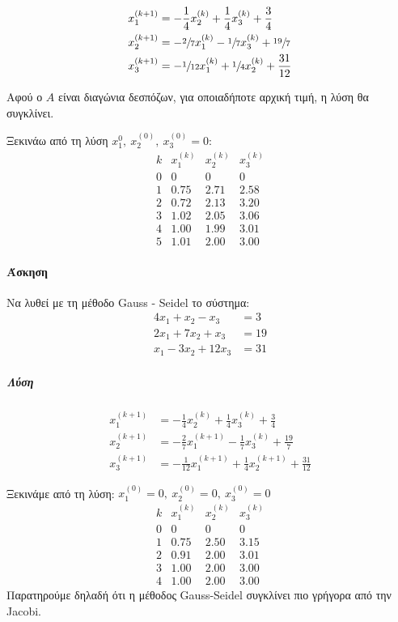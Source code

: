 \documentclass[11pt,a4paper,notitlepage,fleqn]{article}
\begin{document}
\begin{align*}
	x_1^{(k+1)} &= -\frac{1}{4}x_2^{(k)}+\frac{1}{4}x_3^{(k)}+\frac{3}{4}
	\\ x_2^{(k+1)} &= -\sfrac{2}{7} x_1^{(k)}-\sfrac{1}{7} x_3^{(k)}
	+ \sfrac{19}{7} \\
	x_3^{(k+1)} &= -\sfrac{1}{12} x_1^{(k)} + \sfrac{1}{4} x_2^{(k)}
	+\frac{31}{12}
\end{align*}

Αφού ο \( A \) είναι διαγώνια δεσπόζων, για οποιαδήποτε αρχική τιμή,
η λύση θα συγκλίνει.

Ξεκινάω από τη λύση \( x_1^{0},\ x_2^{(0)},\ x_3^{(0)}= 0 \):
\[
\begin{array}{cccc}
k & x_1^{(k)} & x_2^{(k)} & x_3^{(k)} \\ \hline
0 & 0 & 0 & 0 \\
1 & 0.75 & 2.71 & 2.58 \\
2 & 0.72 & 2.13 & 3.20 \\
3 & 1.02 & 2.05 & 3.06 \\
4 & 1.00 & 1.99 & 3.01 \\
5 & 1.01 & 2.00 & 3.00
\end{array}
\]

\paragraph{Άσκηση}
Να λυθεί με τη μέθοδο Gauss - Seidel το σύστημα:
\begin{align*}
4x_1+x_2-x_3 &= 3 \\
2x_1+7x_2+x_3 &= 19 \\
x_1-3x_2+12x_3 &= 31
\end{align*}

\subparagraph{Λύση}
\begin{align*}
x_1^{(k+1)} &= -\frac{1}{4}x_2^{(k)}+\frac{1}{4}x_3^{(k)}+\frac{3}{4}
\\ x_2^{(k+1)} &= -\frac{2}{7} x_1^{(k+1)}-\frac{1}{7} x_3^{(k)}
+ \frac{19}{7} \\
x_3^{(k+1)} &= -\frac{1}{12} x_1^{(k+1)} + \frac{1}{4} x_2^{(k+1)}
+\frac{31}{12}
\end{align*}

Ξεκινάμε από τη λύση:
\( x_1^{(0)}=0,\ x_2^{(0)}=0,\ x_3^{(0)}=0 \)
\[
\begin{array}{cccc}
k & x_1^{(k)} & x_2^{(k)} & x_3^{(k)} \\ \hline
0 & 0 & 0 & 0 \\
1 & 0.75 & 2.50 & 3.15 \\
2 & 0.91 & 2.00 & 3.01 \\
3 & 1.00 & 2.00 & 3.00 \\
4 & 1.00 & 2.00 & 3.00
\end{array}
\]
Παρατηρούμε δηλαδή ότι η μέθοδος Gauss-Seidel συγκλίνει πιο γρήγορα από
την Jacobi.
\end{document}
